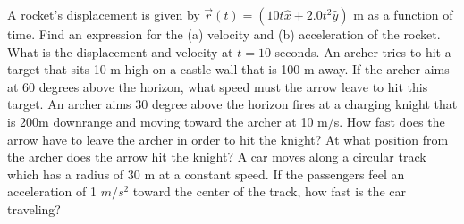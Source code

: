 \documentclass[12pt]{article}
\begin{document}
\pagestyle{empty}
\noindent A rocket's displacement is given by $\vec{r}(t) = (10 t \hat{x} + 2.0 t^2 \hat{y})$ m  as a function of time.  Find an expression for the (a) velocity and (b) acceleration of the rocket.  What is the displacement and velocity at $t=10$ seconds.
\newpage
\noindent An archer tries to hit a target that sits 10 m high on a castle wall that is 100 m away.  If the archer aims at 60 degrees above the horizon, what speed must the arrow leave to hit this target.
\newpage
\noindent An archer aims 30 degree above the horizon fires at a
charging knight that is 200m downrange and moving toward the archer
at 10 m/s.  How fast does the arrow have to leave the
archer in order to hit the knight?  At what position from the archer
does the arrow hit the knight?     
\newpage
\noindent A car moves along a circular track which has a radius of 30 m at a constant speed.  If the passengers feel an acceleration of 1 $m/s^2$ toward the center of the track, how fast is the car traveling?
\end{document}
